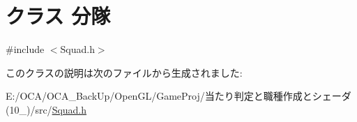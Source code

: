 \hypertarget{class_xE5_x88_x86_xE9_x9A_x8A}{\section{クラス 分隊}
\label{class_xE5_x88_x86_xE9_x9A_x8A}
}


{\ttfamily \#include $<$Squad.\-h$>$}



このクラスの説明は次のファイルから生成されました\-:\begin{DoxyCompactItemize}
\item 
E\-:/\-O\-C\-A/\-O\-C\-A\-\_\-\-Back\-Up/\-Open\-G\-L/\-Game\-Proj/当たり判定と職種作成とシェーダ(10\-\_)/src/\hyperlink{_squad_8h}{Squad.\-h}\end{DoxyCompactItemize}
